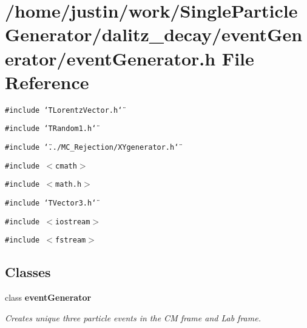 \section{/home/justin/work/Single\-Particle\-Generator/dalitz\_\-decay/event\-Generator/event\-Generator.h File Reference}
\label{eventGenerator_8h}
{\tt \#include \char`\"{}TLorentz\-Vector.h\char`\"{}}\par
{\tt \#include \char`\"{}TRandom1.h\char`\"{}}\par
{\tt \#include \char`\"{}../MC\_\-Rejection/XYgenerator.h\char`\"{}}\par
{\tt \#include $<$cmath$>$}\par
{\tt \#include $<$math.h$>$}\par
{\tt \#include \char`\"{}TVector3.h\char`\"{}}\par
{\tt \#include $<$iostream$>$}\par
{\tt \#include $<$fstream$>$}\par
\subsection*{Classes}
\begin{CompactItemize}
\item 
class \bf{event\-Generator}
\begin{CompactList}\small\item\em Creates unique three particle events in the CM frame and Lab frame. \item\end{CompactList}\end{CompactItemize}
